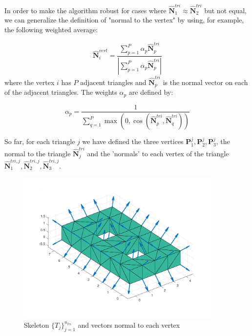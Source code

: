 \documentclass[11pt, oneside]{article}
\newcommand\bP{\boldsymbol P}
\newcommand\bN{\boldsymbol N}
\begin{document}
In order to make the algorithm robust for cases where $\hat{\bN}_1^{tri}\approx\hat{\bN}_2^{tri}$ but not equal, we can generalize the definition of "normal to the vertex" by using, for example, the following weighted average:

\begin{equation}
\hat{\bN}_i^{vert}=\frac{\sum_{p=1}^P\alpha_p \hat{\bN}_p^{tri}}{|\sum_{p=1}^P\alpha_p \hat{\bN}_p^{tri}|}
\end{equation}
where the vertex $i$ has $P$ adjacent triangles and $\hat{\bN}_p^{tri}$ is the normal vector on each of the adjacent triangles. The weights $\alpha_p$ are defined by:

\begin{equation}
\alpha_p=\frac{1}{\sum_{q=1}^P\max(0,\cos(\hat{\bN}_p^{tri},\hat{\bN}_q^{tri}))}
\end{equation}

So far, for each triangle $j$ we have defined the three vertices $\bP_1^j,\bP_2^j,\bP_3^j$, the normal to the triangle $\hat{\bN}^{tri}_j$ and the 'normals' to each vertex of the triangle $\hat{\bN}_1^{tri,j},\hat{\bN}_2^{tri,j},\hat{\bN}_3^{tri,j}$.

\begin{figure}[H]
\begin{center}
\includegraphics[width=4in]{normal_vert_genus_2.pdf}%
\end{center}
\caption{Skeleton $\{\mathit{T}_j\}_{j=1}^{n_{tri}}$ and vectors normal to each vertex}
\label{normalvert3}
\end{figure}
\end{document}
